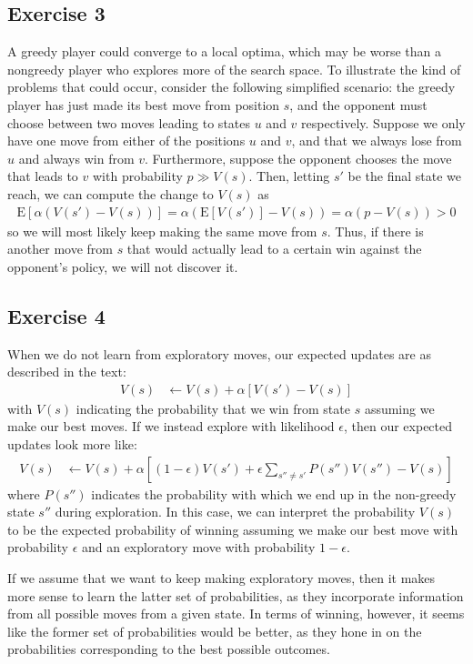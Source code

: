 \subsection{Exercise 3}
A greedy player could converge to a local optima, which may be worse than a nongreedy player who explores more
of the search space. To illustrate the kind of problems that could occur, consider the following simplified
scenario: the greedy player has just made its best move from position $s$, and the opponent must choose
between two moves leading to states $u$ and $v$ respectively. Suppose we only have one move from either of
the positions $u$ and $v$, and that we always lose from $u$ and always win from $v$. Furthermore, suppose
the opponent chooses the move that leads to $v$ with probability $p \gg V(s)$. Then, letting $s'$ be the final
state we reach, we can compute the change to $V(s)$ as
\begin{align*}
        \mathrm{E} [\alpha (V(s') - V(s))] = \alpha (\mathrm{E} [V(s')] - V(s)) = \alpha (p - V(s)) > 0 
\end{align*}
so we will most likely keep making the same move from $s$. Thus, if there is another move from $s$ that 
would actually lead to a certain win against the opponent's policy, we will not discover it.

\subsection{Exercise 4}
When we do not learn from exploratory moves, our expected updates are as described in the text:
\begin{align*}
        V(s) &\gets V(s) + \alpha [V(s') - V(s)]
\end{align*}
with $V(s)$ indicating the probability that we win from state $s$ assuming we make our best moves. 
If we instead explore with likelihood $\epsilon$, then our expected updates look more like:
\begin{align*}
        V(s) &\gets V(s) + \alpha [(1 - \epsilon) V(s') + \epsilon \sum_{s'' \neq s'} P(s'') V(s'') - V(s)]
\end{align*}
where $P(s'')$ indicates the probability with which we end up in the non-greedy state $s''$ during exploration.
In this case, we can interpret the probability $V(s)$ to be the expected probability of winning assuming
we make our best move with probability $\epsilon$ and an exploratory move with probability $1 - \epsilon$. 

If we assume that we want to keep making exploratory moves, then it makes more sense to learn the latter
set of probabilities, as they incorporate information from all possible moves from a given state. In terms of
winning, however, it seems like the former set of probabilities would be better, as they hone in on the
probabilities corresponding to the best possible outcomes. 

